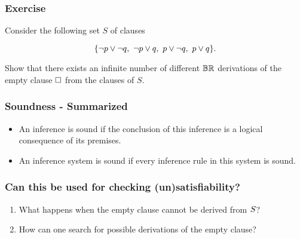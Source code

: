 	   \begin{frame}\frametitle{Exercise}

Consider the following set $S$ of clauses

    \[{
      {\{\neg p \vee \neg q,~\neg p \vee q,~p \vee \neg q,~p \vee q\}}.
    }\]


Show that there exists an infinite number of different ${\mathbb{BR}}$
derivations of  the empty clause $\Box$ from the clauses of
$S$. 

\end{frame}

\begin{frame}\frametitle{Soundness - Summarized}


\begin{itemize}
\item
  \alert{An inference is sound} if 
  the conclusion of this inference is a logical 
  consequence of its premises.

\item
  \alert{An inference system
  is sound} if every inference rule in this system is sound.
\end{itemize}

\bigskip



                           \end{frame}

                           
	   \begin{frame}
\frametitle{Can this be used for checking (un)satisfiability?}


\begin{enumerate}
  \item What happens when the empty clause \alert{cannot be derived}
    from ${S}$?

    \bigskip
    
  \item \alert{How} can one search for possible derivations of the empty clause?
\end{enumerate}

                           \end{frame}


